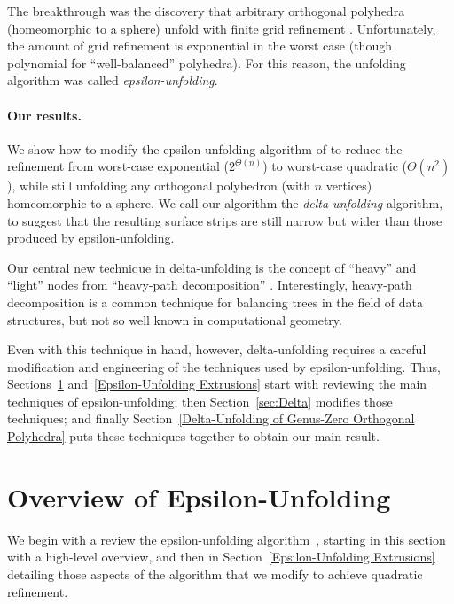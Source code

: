 \documentclass[11pt]{article}
\begin{document}
The breakthrough was the discovery that arbitrary orthogonal polyhedra
(homeomorphic to a sphere) unfold with finite grid refinement
\cite{Damian-Flatland-O'Rourke-2007-epsilon}.
Unfortunately, the amount of grid refinement is exponential
in the worst case (though polynomial for ``well-balanced'' polyhedra).
For this reason, the unfolding algorithm was called
\emph{epsilon-unfolding}.

\paragraph{Our results.}
We show how to modify the epsilon-unfolding algorithm of
\cite{Damian-Flatland-O'Rourke-2007-epsilon}
to reduce the refinement from worst-case exponential ($2^{\Theta(n)}$)
to worst-case quadratic ($\Theta(n^2)$), while still unfolding
any orthogonal polyhedron (with $n$ vertices) homeomorphic to a sphere.
We call our algorithm the \emph{delta-unfolding} algorithm,
to suggest that the resulting surface strips are still narrow
but wider than those produced by epsilon-unfolding.

Our central new technique in delta-unfolding is the concept of ``heavy''
and ``light'' nodes from ``heavy-path decomposition''
\cite{Sleator-Tarjan-1983}.  Interestingly, heavy-path decomposition
is a common technique for balancing trees in the field of data structures,
but not so well known in computational geometry.

Even with this technique in hand, however, delta-unfolding requires a
careful modification and engineering of the techniques used by
epsilon-unfolding.  Thus, Sections~\ref{sec:overview}
and~\ref{Epsilon-Unfolding Extrusions} start with reviewing the
main techniques of epsilon-unfolding; then Section~\ref{sec:Delta}
modifies those techniques; and finally
Section~\ref{Delta-Unfolding of Genus-Zero Orthogonal Polyhedra}
puts these techniques together to obtain our main result.


\section{Overview of Epsilon-Unfolding}
\label{sec:overview}

We begin with a review the epsilon-unfolding algorithm~\cite{Damian-Flatland-O'Rourke-2007-epsilon},
starting in this section with a high-level overview,
and then in Section~\ref{Epsilon-Unfolding Extrusions}
detailing those aspects of the algorithm
that we modify to achieve quadratic refinement.
\end{document}
